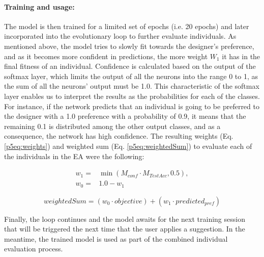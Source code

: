 \paragraph{Training and usage:}

The model is then trained for a limited set of epochs (i.e. 20 epochs) and later incorporated into the evolutionary loop to further evaluate individuals. As mentioned above, the model tries to slowly fit towards the designer’s preference, and as it becomes more confident in predictions, the more weight $W_{1}$ it has in the final fitness of an individual. Confidence is calculated based on the output of the softmax layer, which %
limits the output of all the neurons into the range 0 to 1, as the sum of all the neurons' output must be 1.0. This characteristic of the softmax layer enables us to interpret the results as the probabilities for each of the classes. For instance, if the network predicts that an individual is going to be preferred to the designer with a 1.0 preference with a probability of 0.9, it means that the remaining 0.1 is distributed among the other output classes, and as a consequence, the network has high confidence. The resulting weights (Eq. \ref{p5eq:weights}) and weighted sum (Eq. \ref{p5eq:weightedSum}) to evaluate each of the individuals in the EA were the following:



\begin{equation} \label{p5eq:weights}
\begin{split}
 w_{1}={}&\min(M_{conf} \cdot M_{TestAcc}, 0.5),\\
w_{0} ={}& 1.0 - w_{1}   
\end{split}
\end{equation}


\begin{equation} \label{p5eq:weightedSum}
weightedSum = (w_{0} \cdot objective) + (w_{1} \cdot predicted_{pref})
\end{equation}

Finally, the loop continues and the model awaits for the next training session that will be triggered the next time that the user applies a suggestion. In the meantime, the trained model is used as part of the combined individual evaluation process.